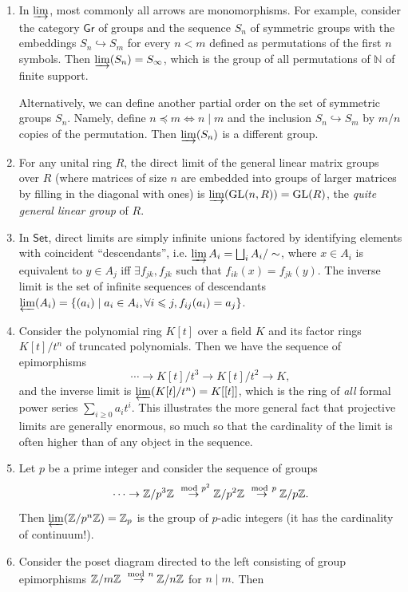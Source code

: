 \begin{example}
\begin{enumerate}
    \item In $\varinjlim$, most commonly all arrows are monomorphisms. For example, consider the category $\mathsf{Gr}$ of groups and the sequence $S_n$ of symmetric groups with the embeddings $S_n\hookrightarrow S_m$ for every $n<m$ defined as permutations of the first $n$ symbols. Then $\varinjlim(S_n)=S_\infty$, which is the group of all permutations of $\mathbb{N}$ of finite support.
    
    Alternatively, we can define another partial order on the set of symmetric groups $S_n$. Namely, define $n\preccurlyeq m\Leftrightarrow n\mid m$ and the inclusion $S_n\hookrightarrow S_m$ by $m/n$ copies of the permutation. Then $\varinjlim (S_n)$ is a different group.
    \item For any unital ring $R$, the direct limit of the general linear matrix groups over $R$ (where matrices of size $n$ are embedded into groups of larger matrices by filling in the diagonal with ones) is $\varinjlim(\operatorname{GL}(n,R))=\operatorname{GL}(R)$, the \emph{quite general linear group} of $R$.
    \item In $\mathsf{Set}$, direct limits are simply infinite unions factored by identifying elements with coincident ``descendants'', i.e. $\varinjlim A_i=\bigsqcup_i A_i/\sim$, where $x\in A_i$ is equivalent to $y\in A_j$ iff $\exists f_{jk},f_{jk}$ such that $f_{ik}(x)=f_{jk}(y)$. The inverse limit is the set of infinite sequences of descendants $\varprojlim (A_i)=\{(a_i)\mid a_i\in A_i,\forall i\leqslant j, f_{ij}(a_i)=a_j\}$.
    \item Consider the polynomial ring $K[t]$ over a field $K$ and its factor rings $K[t]/t^n$ of truncated polynomials. Then we have the sequence of epimorphisms 
    \[\cdots \to K[t]/t^3\to K[t]/t^2\to K,\]
    and the inverse limit is $\varprojlim(K[t]/t^n)=K[[t]]$, which is the ring of \emph{all} formal power series $\sum_{i\geq 0}a_i t^i$. This illustrates the more general fact that projective limits are generally enormous, so much so that the cardinality of the limit is often higher than of any object in the sequence.
    \item Let $p$ be a prime integer and consider the sequence of groups
    \[\cdots\to \mathbb{Z}/p^3 \mathbb{Z}\overset{\ \mathrm{mod}\  p^2}\to \mathbb{Z}/p^2\mathbb{Z}\overset{\ \mathrm{mod}\  p}\to \mathbb{Z}/p\mathbb{Z}.\]
    Then $\varprojlim(\mathbb{Z}/p^n\mathbb{Z})=\mathbb{Z}_p$ is the group of $p$-adic integers (it has the cardinality of continuum!).
    \item Consider the poset diagram directed to the left consisting of group epimorphisms $\mathbb{Z}/m\mathbb{Z}\overset{\ \mathrm{mod}\  n}\to \mathbb{Z}/n\mathbb{Z}$ for $n\mid m$. Then 

\end{enumerate}
\end{example}
